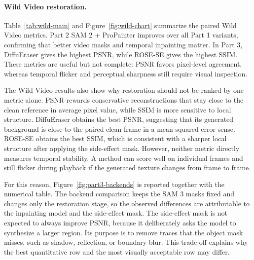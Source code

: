 \documentclass[10pt,twocolumn,letterpaper]{article}
\begin{document}
\paragraph{Wild Video restoration.}
Table~\ref{tab:wild-main} and Figure~\ref{fig:wild-chart} summarize the paired Wild Video metrics. Part 2 SAM 2 + ProPainter improves over all Part 1 variants, confirming that better video masks and temporal inpainting matter. In Part 3, DiffuEraser gives the highest PSNR, while ROSE-SE gives the highest SSIM. These metrics are useful but not complete: PSNR favors pixel-level agreement, whereas temporal flicker and perceptual sharpness still require visual inspection.

The Wild Video results also show why restoration should not be ranked by one metric alone. PSNR rewards conservative reconstructions that stay close to the clean reference in average pixel value, while SSIM is more sensitive to local structure. DiffuEraser obtains the best PSNR, suggesting that its generated background is close to the paired clean frame in a mean-squared-error sense. ROSE-SE obtains the best SSIM, which is consistent with a sharper local structure after applying the side-effect mask. However, neither metric directly measures temporal stability. A method can score well on individual frames and still flicker during playback if the generated texture changes from frame to frame.

For this reason, Figure~\ref{fig:part3-backends} is reported together with the numerical table. The backend comparison keeps the SAM 3 masks fixed and changes only the restoration stage, so the observed differences are attributable to the inpainting model and the side-effect mask. The side-effect mask is not expected to always improve PSNR, because it deliberately asks the model to synthesize a larger region. Its purpose is to remove traces that the object mask misses, such as shadow, reflection, or boundary blur. This trade-off explains why the best quantitative row and the most visually acceptable row may differ.
\end{document}
